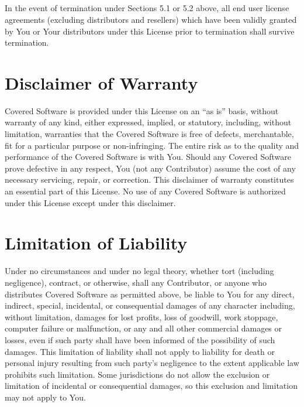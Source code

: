 \documentclass[a4paper, 12pt]{article}
\begin{document}
\subsection{}

In the event of termination under Sections 5.1 or 5.2 above, all end user license agreements (excluding distributors and resellers) which have been validly granted by You or Your distributors under this License prior to termination shall survive termination.

\section{Disclaimer of Warranty}

Covered Software is provided under this License on an ``as is'' basis, without warranty of any kind, either expressed, implied, or statutory, including, without limitation, warranties that the Covered Software is free of defects, merchantable, fit for a particular purpose or non-infringing. The entire risk as to the quality and performance of the Covered Software is with You. Should any Covered Software prove defective in any respect, You (not any Contributor) assume the cost of any necessary servicing, repair, or correction. This disclaimer of warranty constitutes an essential part of this License. No use of any Covered Software is authorized under this License except under this disclaimer.

\section{Limitation of Liability}

Under no circumstances and under no legal theory, whether tort (including negligence), contract, or otherwise, shall any Contributor, or anyone who distributes Covered Software as permitted above, be liable to You for any direct, indirect, special, incidental, or consequential damages of any character including, without limitation, damages for lost profits, loss of goodwill, work stoppage, computer failure or malfunction, or any and all other commercial damages or losses, even if such party shall have been informed of the possibility of such damages. This limitation of liability shall not apply to liability for death or personal injury resulting from such party's negligence to the extent applicable law prohibits such limitation. Some jurisdictions do not allow the exclusion or limitation of incidental or consequential damages, so this exclusion and limitation may not apply to You.
\end{document}
